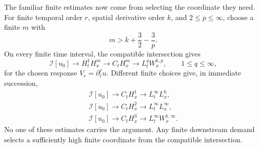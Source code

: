 The familiar finite estimates now come from selecting the coordinate they need.
For finite temporal order \(r\), spatial derivative order \(k\), and
\(2\le p\le\infty\), choose a finite \(m\) with
\[
m>k+\frac32-\frac3p.
\]
On every finite time interval, the compatible intersection gives
\[
\mathcal I[u_0]
\longrightarrow H_t^1H_x^m
\longrightarrow C_tH_x^m
\longrightarrow L_t^qW_x^{k,p},
\qquad 1\le q\le\infty,
\]
for the chosen response \(V_r=\partial_t^ru\). Different finite choices give,
in immediate succession,
\[
\begin{gathered}
\mathcal I[u_0]\longrightarrow C_tH_x^1
\longrightarrow L_t^\infty L_x^6,\\[2mm]
\mathcal I[u_0]\longrightarrow C_tH_x^2
\longrightarrow L_t^\infty L_x^\infty,\\[2mm]
\mathcal I[u_0]\longrightarrow C_tH_x^3
\longrightarrow L_t^\infty W_x^{1,\infty}.
\end{gathered}
\]
No one of these estimates carries the argument. Any finite downstream demand
selects a sufficiently high finite coordinate from the compatible
intersection.

